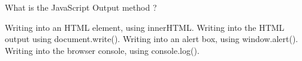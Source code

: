 What is the JavaScript Output method ?

Writing into an HTML element, using innerHTML.
Writing into the HTML output using document.write().
Writing into an alert box, using window.alert().
Writing into the browser console, using console.log().